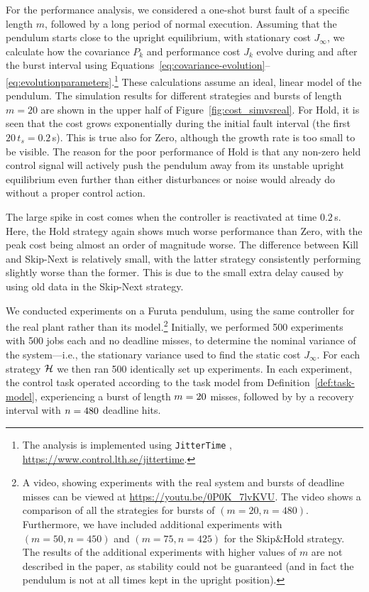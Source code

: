 \begin{figure}

\end{figure}

For the performance analysis, we considered a one-shot burst fault of a specific length $m$, followed by a long period of normal execution. 
Assuming that the pendulum starts close to the upright equilibrium, with stationary cost $J_\infty$, we calculate how the covariance $P_k$ and performance cost $J_k$ evolve during and after the burst interval using Equations~\eqref{eq:covariance-evolution}--\eqref{eq:evolutionparameters}.\footnote{The analysis is implemented using {\tt JitterTime} \cite{Cervin:2019}, \url{https://www.control.lth.se/jittertime}.} 
These calculations assume an ideal, linear model of the pendulum. 
The simulation results for different strategies and bursts of length $m=20$ are shown in the upper half of Figure~\ref{fig:cost_simvsreal}. 
For Hold, it is seen that the cost grows exponentially during the initial fault interval (the first $20\,t_s=0.2\,$s). 
This is true also for Zero, although the growth rate is too small to be visible.
The reason for the poor performance of Hold is that any non-zero held control signal will actively push the pendulum away from its unstable upright equilibrium even further than either disturbances or noise would already do without a proper control action.

The large spike in cost comes when the controller is reactivated at time $0.2\,$s. 
Here, the Hold strategy again shows much worse performance than Zero, with the peak cost being almost an order of magnitude worse. 
The difference between Kill and Skip-Next is relatively small, with the latter strategy consistently performing slightly worse than the former. 
This is due to the small extra delay caused by using old data in the Skip-Next strategy.

We conducted experiments on a Furuta pendulum, using the same controller for the real plant rather than its model.\footnote{A video, showing experiments with the real system and bursts of deadline misses can be viewed at \url{https://youtu.be/0P0K_7lvKVU}. The video shows a comparison of all the strategies for bursts of $(m = 20, n=480)$. Furthermore, we have included additional experiments with $(m=50, n=450)$ and $(m=75, n=425)$ for the Skip\&Hold strategy. The results of the additional experiments with higher values of $m$ are not described in the paper, as stability could not be guaranteed (and in fact the pendulum is not at all times kept in the upright position).}
Initially, we performed 500 experiments with 500 jobs each and no deadline misses, to determine the nominal variance of the system---i.e., the stationary variance used to find the static cost $J_\infty$.
For each strategy $\mathcal{H}$ we then ran 500 identically set up experiments. 
In each experiment, the control task operated according to the task model from Definition~\ref{def:task-model}, experiencing a burst of length $m=20$ misses, followed by by a recovery interval with $n=480$ deadline hits.

